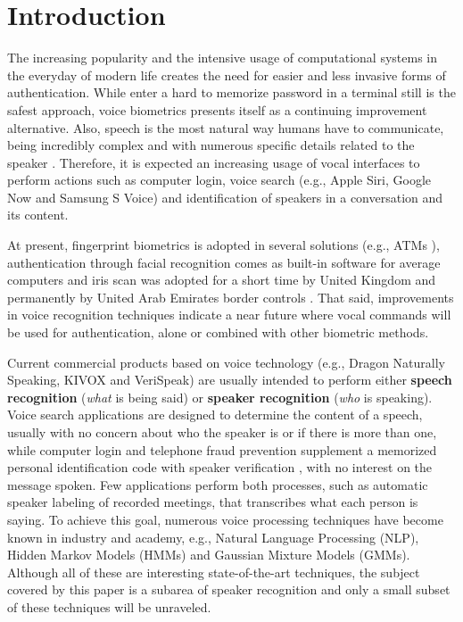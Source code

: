 \chapter{Introduction}
\label{ch:intro}

The increasing popularity and the intensive usage of computational systems in the everyday of modern life creates the need for easier and less invasive forms of authentication. While enter a hard to memorize password in a terminal still is the safest approach, voice biometrics presents itself as a continuing improvement alternative. Also, speech is the most natural way humans have to communicate, being incredibly complex and with numerous specific details related to the speaker \cite{bimbot.et.al.2004}. Therefore, it is expected an increasing usage of vocal interfaces to perform actions such as computer login, voice search (e.g., Apple Siri, Google Now and Samsung S Voice) and identification of speakers in a conversation and its content.

At present, fingerprint biometrics is adopted in several solutions (e.g., ATMs \cite{wang.wu.2002}), authentication through facial recognition comes as built-in software for average computers and iris scan was adopted for a short time by United Kingdom and permanently by United Arab Emirates border controls \cite{sasse.2007, raisi.khouri.2008}. That said, improvements in voice recognition techniques indicate a near future where vocal commands will be used for authentication, alone or combined with other biometric methods.

Current commercial products based on voice technology (e.g., Dragon Naturally Speaking, KIVOX and VeriSpeak) are usually intended to perform either \textbf{speech recognition} (\emph{what} is being said) or \textbf{speaker recognition} (\emph{who} is speaking). Voice search applications are designed to determine the content of a speech, usually with no concern about who the speaker is or if there is more than one, while computer login and telephone fraud prevention supplement a memorized personal identification code with speaker verification \cite{reynolds.1995a}, with no interest on the message spoken. Few applications perform both processes, such as automatic speaker labeling of recorded meetings, that transcribes what each person is saying. To achieve this goal, numerous voice processing techniques have become known in industry and academy, e.g., Natural Language Processing (NLP), Hidden Markov Models (HMMs) and Gaussian Mixture Models (GMMs). Although all of these are interesting state-of-the-art techniques, the subject covered by this paper is a subarea of speaker recognition and only a small subset of these techniques will be unraveled.

